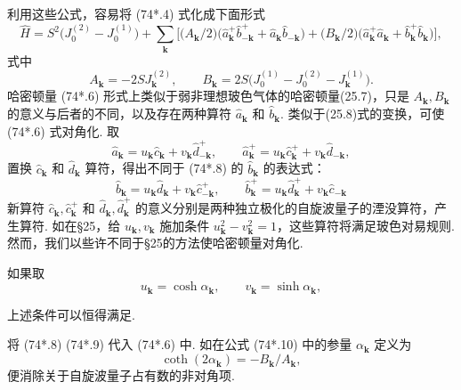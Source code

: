 利用这些公式，容易将 (74*.4) 式化成下面形式
\begin{equation*}
\hat{H}=S^2\bigl(J_0^{(2)}-J_0^{(1)}\bigr)
+\sum_{\bm{k}}\bigl[\bigl(A_{\bm{k}}/2\bigr)
\bigl(\hat{a}_{\bm{k}}^{+}\hat{b}_{-\bm{k}}^{+}+\hat{a}_{\bm{k}}\hat{b}_{-\bm{k}}\bigr)
+\bigl(B_{\bm{k}}/2\bigr)
\bigl(\hat{a}_{\bm{k}}^{+}\hat{a}_{\bm{k}}+\hat{b}_{\bm{k}}^{+}\hat{b}_{\bm{k}}\bigr)\bigr],
\tag{74*.6}
\end{equation*}
式中
\begin{equation*}
A_{\bm{k}}=-2SJ_{\bm{k}}^{(2)},\qquad
B_{\bm{k}}=2S\bigl(J_0^{(1)}-J_0^{(2)}-J_{\bm{k}}^{(1)}\bigr).
\tag{74*.7}
\end{equation*}
哈密顿量 (74*.6) 形式上类似于弱非理想玻色气体的哈密顿量(25.7)，只是 $A_{\bm{k}},B_{\bm{k}}$ 的意义与后者的不同，以及存在两种算符 $\hat{a}_{\bm{k}}$ 和 $\hat{b}_{\bm{k}}$. 类似于(25.8)式的变换，可使 (74*.6) 式对角化. 取
\begin{equation*}
\hat{a}_{\bm{k}}=u_{\bm{k}}\hat{c}_{\bm{k}}+v_{\bm{k}}\hat{d}^{+}_{-\bm{k}},
\qquad
\hat{a}_{\bm{k}}^{+}=u_{\bm{k}}\hat{c}_{\bm{k}}^{+}+v_{\bm{k}}\hat{d}_{-\bm{k}},
\tag{74*.8}
\end{equation*}
置换 $\hat{c}_{\bm{k}}$ 和 $\hat{d}_{\bm{k}}$ 算符，得出不同于 (74*.8) 的 $\hat{b}_{\bm{k}}$ 的表达式：
\begin{equation*}
\hat{b}_{\bm{k}}=u_{\bm{k}}\hat{d}_{\bm{k}}+v_{\bm{k}}\hat{c}^{+}_{-\bm{k}},
\qquad
\hat{b}_{\bm{k}}^{+}=u_{\bm{k}}\hat{d}_{\bm{k}}^{+}+v_{\bm{k}}\hat{c}_{-\bm{k}}
\tag{74*.9}
\end{equation*}
新算符 $\hat{c}_{\bm{k}},\hat{c}_{\bm{k}}^{+}$ 和 $\hat{d}_{\bm{k}},\hat{d}_{\bm{k}}^{+}$ 的意义分别是两种独立极化的自旋波量子的湮没算符，产生算符. 如在§25，给 $u_{\bm{k}},v_{\bm{k}}$ 施加条件 $u_{\bm{k}}^2-v_{\bm{k}}^2=1$，这些算符将满足玻色对易规则. 然而，我们以些许不同于§25的方法使哈密顿量对角化.

如果取
\begin{equation*}
u_{\bm{k}}=\cosh\alpha_{\bm{k}},\qquad
v_{\bm{k}}=\sinh\alpha_{\bm{k}},
\tag{74*.10}
\end{equation*}

上述条件可以恒得满足.

将 (74*.8) (74*.9) 代入 (74*.6) 中. 如在公式 (74*.10) 中的参量 $\alpha_{\bm{k}}$ 定义为
\begin{equation*}
\coth(2\alpha_{\bm{k}})=-B_{\bm{k}}/A_{\bm{k}},
\end{equation*}
便消除关于自旋波量子占有数的非对角项.

